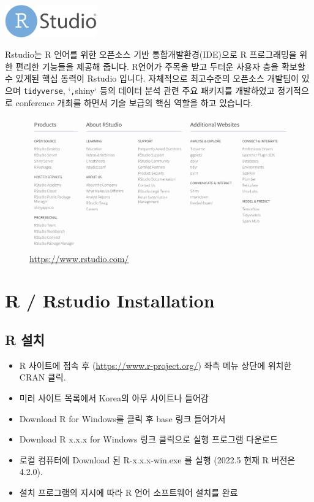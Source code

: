 \documentclass[
]{book}
\providecommand{\tightlist}{%
  \setlength{\itemsep}{0pt}\setlength{\parskip}{0pt}}
\begin{document}
\includegraphics[width=1.5625in,height=\textheight]{images/01/rstudio.png}

Rstudio는 R 언어를 위한 오픈소스 기반 통합개발환경(IDE)으로 R 프로그래밍을 위한 편리한 기능들을 제공해 줍니다. R언어가 주목을 받고 두터운 사용자 층을 확보할 수 있게된 핵심 동력이 Rstudio 입니다. 자체적으로 최고수준의 오픈소스 개발팀이 있으며 \texttt{tidyverse}, `\texttt{,}shiny` 등의 데이터 분석 관련 주요 패키지를 개발하였고 정기적으로 conference 개최를 하면서 기술 보급의 핵심 역할을 하고 있습니다.

\begin{figure}
\centering
\includegraphics[width=5.72917in,height=\textheight]{images/01/rstudiobottom.png}
\caption{\url{https://www.rstudio.com/}}
\end{figure}

\hypertarget{r-rstudio-installation}{%
\section{R / Rstudio Installation}\label{r-rstudio-installation}}

\hypertarget{r-uxc124uxce58}{%
\subsection{R 설치}\label{r-uxc124uxce58}}

\begin{itemize}
\tightlist
\item
  R 사이트에 접속 후 (\url{https://www.r-project.org/}) 좌측 메뉴 상단에 위치한 CRAN 클릭.
\item
  미러 사이트 목록에서 Korea의 아무 사이트나 들어감
\item
  Download R for Windows를 클릭 후 base 링크 들어가서
\item
  Download R x.x.x for Windows 링크 클릭으로 실행 프로그램 다운로드
\item
  로컬 컴퓨터에 Download 된 R-x.x.x-win.exe 를 실행 (2022.5 현재 R 버전은 4.2.0).
\item
  설치 프로그램의 지시에 따라 R 언어 소프트웨어 설치를 완료
\end{itemize}
\end{document}
